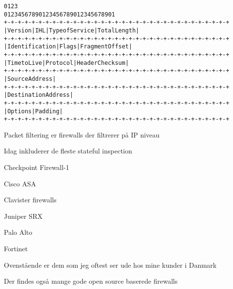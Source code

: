 \documentclass[Screen16to9,17pt]{foils}
\begin{document}
\begin{alltt}\footnotesize
0                   1                   2                   3
0 1 2 3 4 5 6 7 8 9 0 1 2 3 4 5 6 7 8 9 0 1 2 3 4 5 6 7 8 9 0 1
+-+-+-+-+-+-+-+-+-+-+-+-+-+-+-+-+-+-+-+-+-+-+-+-+-+-+-+-+-+-+-+-+
|Version|  IHL  |Type of Service|          Total Length         |
+-+-+-+-+-+-+-+-+-+-+-+-+-+-+-+-+-+-+-+-+-+-+-+-+-+-+-+-+-+-+-+-+
|         Identification        |Flags|      Fragment Offset    |
+-+-+-+-+-+-+-+-+-+-+-+-+-+-+-+-+-+-+-+-+-+-+-+-+-+-+-+-+-+-+-+-+
|  Time to Live |    Protocol   |         Header Checksum       |
+-+-+-+-+-+-+-+-+-+-+-+-+-+-+-+-+-+-+-+-+-+-+-+-+-+-+-+-+-+-+-+-+
|                       Source Address                          |
+-+-+-+-+-+-+-+-+-+-+-+-+-+-+-+-+-+-+-+-+-+-+-+-+-+-+-+-+-+-+-+-+
|                    Destination Address                        |
+-+-+-+-+-+-+-+-+-+-+-+-+-+-+-+-+-+-+-+-+-+-+-+-+-+-+-+-+-+-+-+-+
|                    Options                    |    Padding    |
+-+-+-+-+-+-+-+-+-+-+-+-+-+-+-+-+-+-+-+-+-+-+-+-+-+-+-+-+-+-+-+-+
\end{alltt}

\begin{list1}
\item Packet filtering er firewalls der filtrerer på IP niveau
\item Idag inkluderer de fleste stateful inspection
\end{list1}

\begin{list2}
\item Checkpoint Firewall-1 
\item Cisco ASA 
\item Clavister firewalls 
\item Juniper SRX 
\item Palo Alto 
\item Fortinet 
\end{list2}

Ovenstående er dem som jeg oftest ser ude hos mine kunder i Danmark

Der findes også mange gode open source baserede firewalls


\end{document}

